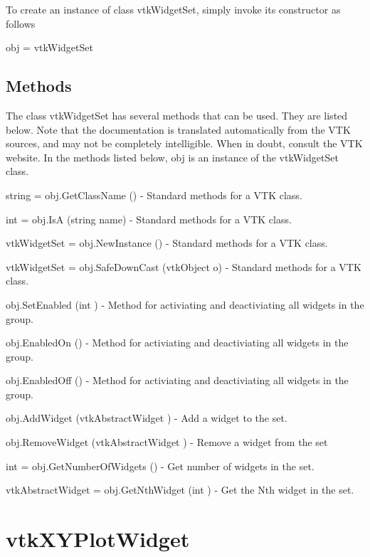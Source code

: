 To create an instance of class vtk\-Widget\-Set, simply invoke its constructor as follows \begin{DoxyVerb}  obj = vtkWidgetSet
\end{DoxyVerb}
 \hypertarget{vtkwidgets_vtkxyplotwidget_Methods}{}\subsection{Methods}\label{vtkwidgets_vtkxyplotwidget_Methods}
The class vtk\-Widget\-Set has several methods that can be used. They are listed below. Note that the documentation is translated automatically from the V\-T\-K sources, and may not be completely intelligible. When in doubt, consult the V\-T\-K website. In the methods listed below, {\ttfamily obj} is an instance of the vtk\-Widget\-Set class. 
\begin{DoxyItemize}
\item {\ttfamily string = obj.\-Get\-Class\-Name ()} -\/ Standard methods for a V\-T\-K class.  
\item {\ttfamily int = obj.\-Is\-A (string name)} -\/ Standard methods for a V\-T\-K class.  
\item {\ttfamily vtk\-Widget\-Set = obj.\-New\-Instance ()} -\/ Standard methods for a V\-T\-K class.  
\item {\ttfamily vtk\-Widget\-Set = obj.\-Safe\-Down\-Cast (vtk\-Object o)} -\/ Standard methods for a V\-T\-K class.  
\item {\ttfamily obj.\-Set\-Enabled (int )} -\/ Method for activiating and deactiviating all widgets in the group.  
\item {\ttfamily obj.\-Enabled\-On ()} -\/ Method for activiating and deactiviating all widgets in the group.  
\item {\ttfamily obj.\-Enabled\-Off ()} -\/ Method for activiating and deactiviating all widgets in the group.  
\item {\ttfamily obj.\-Add\-Widget (vtk\-Abstract\-Widget )} -\/ Add a widget to the set.  
\item {\ttfamily obj.\-Remove\-Widget (vtk\-Abstract\-Widget )} -\/ Remove a widget from the set  
\item {\ttfamily int = obj.\-Get\-Number\-Of\-Widgets ()} -\/ Get number of widgets in the set.  
\item {\ttfamily vtk\-Abstract\-Widget = obj.\-Get\-Nth\-Widget (int )} -\/ Get the Nth widget in the set.  
\end{DoxyItemize}\hypertarget{vtkwidgets_vtkxyplotwidget}{}\section{vtk\-X\-Y\-Plot\-Widget}\label{vtkwidgets_vtkxyplotwidget}
